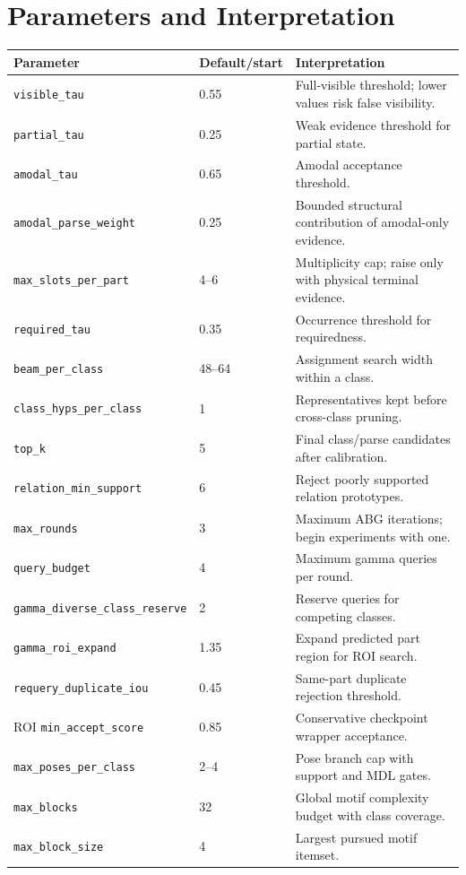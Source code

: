 \documentclass[11pt]{article}
\newcommand{\code}[1]{\texttt{#1}}
\begin{document}
\section{Parameters and Interpretation}

\begin{longtable}{p{}p{}p{}}
\toprule
Parameter & Default/start & Interpretation \\
\midrule
\endhead
\code{visible\_tau} & 0.55 & Full-visible threshold; lower values risk false visibility. \\
\code{partial\_tau} & 0.25 & Weak evidence threshold for partial state. \\
\code{amodal\_tau} & 0.65 & Amodal acceptance threshold. \\
\code{amodal\_parse\_weight} & 0.25 & Bounded structural contribution of amodal-only evidence. \\
\code{max\_slots\_per\_part} & 4--6 & Multiplicity cap; raise only with physical terminal evidence. \\
\code{required\_tau} & 0.35 & Occurrence threshold for requiredness. \\
\code{beam\_per\_class} & 48--64 & Assignment search width within a class. \\
\code{class\_hyps\_per\_class} & 1 & Representatives kept before cross-class pruning. \\
\code{top\_k} & 5 & Final class/parse candidates after calibration. \\
\code{relation\_min\_support} & 6 & Reject poorly supported relation prototypes. \\
\code{max\_rounds} & 3 & Maximum ABG iterations; begin experiments with one. \\
\code{query\_budget} & 4 & Maximum gamma queries per round. \\
\code{gamma\_diverse\_class\_reserve} & 2 & Reserve queries for competing classes. \\
\code{gamma\_roi\_expand} & 1.35 & Expand predicted part region for ROI search. \\
\code{requery\_duplicate\_iou} & 0.45 & Same-part duplicate rejection threshold. \\
ROI \code{min\_accept\_score} & 0.85 & Conservative checkpoint wrapper acceptance. \\
\code{max\_poses\_per\_class} & 2--4 & Pose branch cap with support and MDL gates. \\
\code{max\_blocks} & 32 & Global motif complexity budget with class coverage. \\
\code{max\_block\_size} & 4 & Largest pursued motif itemset. \\
\bottomrule
\end{longtable}
\end{document}
